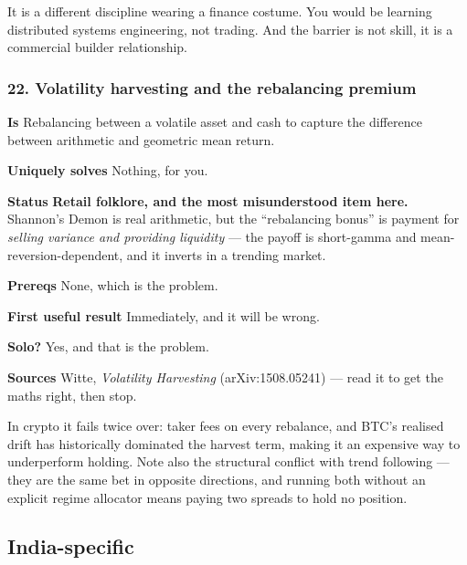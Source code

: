 \documentclass[11pt,a4paper]{article}
\newcommand{\dec}[1]{\textcolor{decayed}{\textbf{#1}}}
\newcommand{\fitem}[1]{\par\smallskip\noindent\textbf{#1} }
\begin{document}
\begin{waste}
It is a different discipline wearing a finance costume. You would be learning
distributed systems engineering, not trading. And the barrier is not skill, it is
a commercial builder relationship.
\end{waste}

\subsubsection{22. Volatility harvesting and the rebalancing premium}
\fitem{Is}Rebalancing between a volatile asset and cash to capture the difference
between arithmetic and geometric mean return.
\fitem{Uniquely solves}Nothing, for you.
\fitem{Status}\dec{Retail folklore, and the most misunderstood item here.}
Shannon's Demon is real arithmetic, but the ``rebalancing bonus'' is payment for
\emph{selling variance and providing liquidity} --- the payoff is short-gamma and
mean-reversion-dependent, and it inverts in a trending market.
\fitem{Prereqs}None, which is the problem.
\fitem{First useful result}Immediately, and it will be wrong.
\fitem{Solo?}Yes, and that is the problem.
\fitem{Sources}Witte, \emph{Volatility Harvesting} (arXiv:1508.05241) --- read it
to get the maths right, then stop.

\begin{waste}
In crypto it fails twice over: taker fees on every rebalance, and BTC's realised
drift has historically dominated the harvest term, making it an expensive way to
underperform holding. Note also the structural conflict with trend following ---
they are the same bet in opposite directions, and running both without an
explicit regime allocator means paying two spreads to hold no position.
\end{waste}

\subsection{India-specific}
\end{document}
